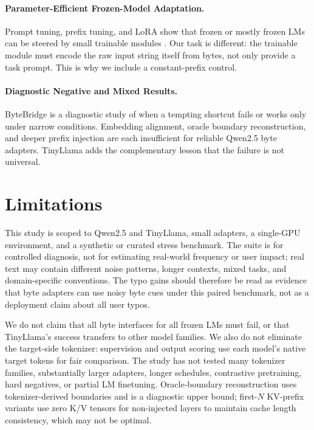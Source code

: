 \documentclass[runningheads]{llncs}
\newcommand{\bb}{ByteBridge}
\begin{document}
\paragraph{Parameter-Efficient Frozen-Model Adaptation.}
Prompt tuning, prefix tuning, and LoRA show that frozen or mostly frozen LMs can be steered by small trainable modules \cite{hu2022lora,lester2021prompttuning,li2021prefixtuning}. Our task is different: the trainable module must encode the raw input string itself from bytes, not only provide a task prompt. This is why we include a constant-prefix control.

\paragraph{Diagnostic Negative and Mixed Results.}
\bb{} is a diagnostic study of when a tempting shortcut fails or works only under narrow conditions. Embedding alignment, oracle boundary reconstruction, and deeper prefix injection are each insufficient for reliable Qwen2.5 byte adapters. TinyLlama adds the complementary lesson that the failure is not universal.

\section{Limitations}

This study is scoped to Qwen2.5 and TinyLlama, small adapters, a single-GPU environment, and a synthetic or curated stress benchmark. The suite is for controlled diagnosis, not for estimating real-world frequency or user impact; real text may contain different noise patterns, longer contexts, mixed tasks, and domain-specific conventions. The typo gains should therefore be read as evidence that byte adapters can use noisy byte cues under this paired benchmark, not as a deployment claim about all user typos.

We do not claim that all byte interfaces for all frozen LMs must fail, or that TinyLlama's success transfers to other model families. We also do not eliminate the target-side tokenizer: supervision and output scoring use each model's native target tokens for fair comparison. The study has not tested many tokenizer families, substantially larger adapters, longer schedules, contrastive pretraining, hard negatives, or partial LM finetuning. Oracle-boundary reconstruction uses tokenizer-derived boundaries and is a diagnostic upper bound; first-$N$ KV-prefix variants use zero K/V tensors for non-injected layers to maintain cache length consistency, which may not be optimal.
\end{document}
